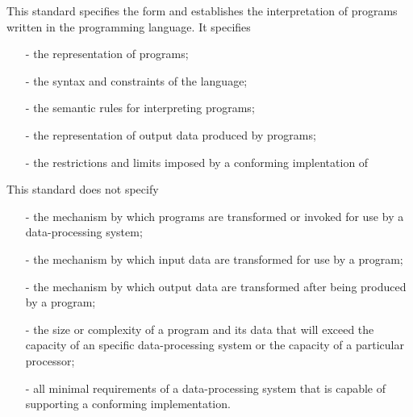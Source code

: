 %
%
%
%
This standard specifies the form and establishes the interpretation of programs 
written 
in the \lP programming language.
It specifies
\begin{itemize}
\item[-] the representation of \lP programs;
\item[-] the syntax and constraints of the \lP language;
\item[-] the semantic rules for interpreting \lP programs;
\item[-] the representation of output data produced by \lP programs;
\item[-] the restrictions and limits imposed by a conforming implentation of \lP
\end{itemize}

This standard does not specify
\begin{itemize}
\item[-] the mechanism by which \lP programs are transformed or invoked for use by a data-processing system;
\item[-] the mechanism by which input data are transformed for use by a \lP program;
\item[-] the mechanism by which output data are transformed after being produced by a \lP program;
\item[-] the size or complexity of a program and its data that will exceed the capacity of an specific data-processing system or the capacity of a particular processor;
\item[-] all minimal requirements of a data-processing system that is capable of supporting a conforming implementation.
\end{itemize}
